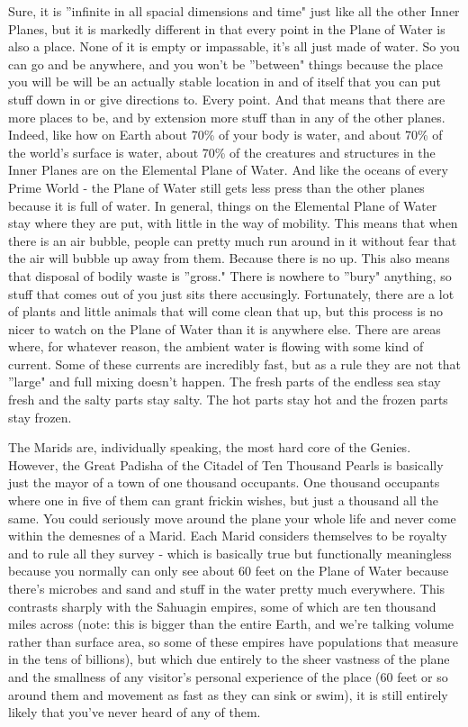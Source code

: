 Sure, it is ''infinite in all spacial dimensions and time" just like all the other Inner Planes, but it is markedly different in that every point in the Plane of Water is also a place. None of it is empty or impassable, it's all just made of water. So you can go and be anywhere, and you won't be ''between" things because the place you will be will be an actually stable location in and of itself that you can put stuff down in or give directions to. Every point. And that means that there are more places to be, and by extension more stuff than in any of the other planes. Indeed, like how on Earth about 70\% of your body is water, and about 70\% of the world's surface is water, about 70\% of the creatures and structures in the Inner Planes are on the Elemental Plane of Water. And like the oceans of every Prime World - the Plane of Water still gets less press than the other planes because it is full of water. In general, things on the Elemental Plane of Water stay where they are put, with little in the way of mobility. This means that when there is an air bubble, people can pretty much run around in it without fear that the air will bubble up away from them. Because there is no up. This also means that disposal of bodily waste is ''gross." There is nowhere to ''bury" anything, so stuff that comes out of you just sits there accusingly. Fortunately, there are a lot of plants and little animals that will come clean that up, but this process is no nicer to watch on the Plane of Water than it is anywhere else. There are areas where, for whatever reason, the ambient water is flowing with some kind of current. Some of these currents are incredibly fast, but as a rule they are not that ''large" and full mixing doesn't happen. The fresh parts of the endless sea stay fresh and the salty parts stay salty. The hot parts stay hot and the frozen parts stay frozen.

The Marids are, individually speaking, the most hard core of the Genies. However, the Great Padisha of the Citadel of Ten Thousand Pearls is basically just the mayor of a town of one thousand occupants. One thousand occupants where one in five of them can grant frickin wishes, but just a thousand all the same. You could seriously move around the plane your whole life and never come within the demesnes of a Marid. Each Marid considers themselves to be royalty and to rule all they survey - which is basically true but functionally meaningless because you normally can only see about 60 feet on the Plane of Water because there's microbes and sand and stuff in the water pretty much everywhere. This contrasts sharply with the Sahuagin empires, some of which are ten thousand miles across (note: this is bigger than the entire Earth, and we're talking volume rather than surface area, so some of these empires have populations that measure in the tens of billions), but which due entirely to the sheer vastness of the plane and the smallness of any visitor's personal experience of the place (60 feet or so around them and movement as fast as they can sink or swim), it is still entirely likely that you've never heard of any of them.

